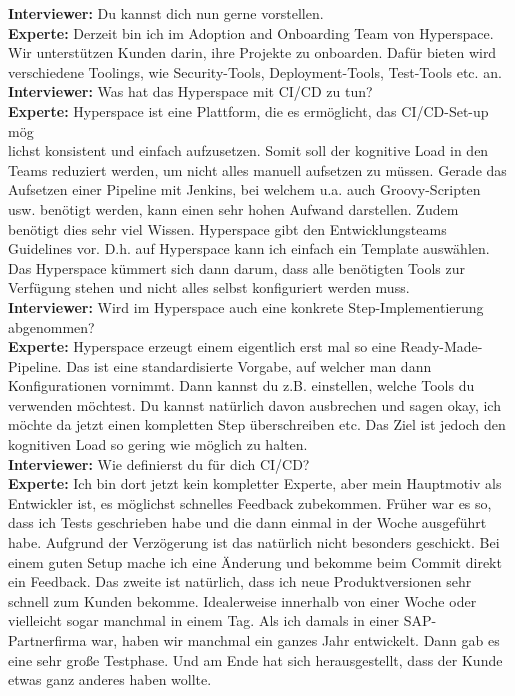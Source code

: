 \begin{linenumbers}
    \textbf{Interviewer:} Du kannst dich nun gerne vorstellen.\\
    \textbf{Experte:} Derzeit bin ich im Adoption and Onboarding Team von Hyperspace. Wir unterstützen Kunden darin, ihre Projekte zu onboarden. Dafür bieten wird verschiedene Toolings, wie Security-Tools, Deployment-Tools, Test-Tools etc. an.\\
    \textbf{Interviewer:} Was hat das Hyperspace mit CI/CD zu tun?\\
    \textbf{Experte:} Hyperspace ist eine Plattform, die es ermöglicht, das CI/CD-Set-up mög\\lichst konsistent und einfach aufzusetzen. Somit soll der kognitive Load in den Teams reduziert werden, um nicht alles manuell aufsetzen zu müssen. Gerade das Aufsetzen einer Pipeline mit Jenkins, bei welchem u.a. auch Groovy-Scripten usw. benötigt werden, kann einen sehr hohen Aufwand darstellen. Zudem benötigt dies sehr viel Wissen. Hyperspace gibt den Entwicklungsteams Guidelines vor. D.h. auf Hyperspace kann ich einfach ein Template auswählen. Das Hyperspace kümmert sich dann darum, dass alle benötigten Tools zur Verfügung stehen und nicht alles selbst konfiguriert werden muss.\\
    \textbf{Interviewer:} Wird im Hyperspace auch eine konkrete Step-Implementierung abgenommen?\\
    \textbf{Experte:}  Hyperspace erzeugt einem eigentlich erst mal so eine Ready-Made-Pipeline. Das ist eine standardisierte Vorgabe, auf welcher man dann Konfigurationen vornimmt. Dann kannst du z.B. einstellen, welche Tools du verwenden möchtest. Du kannst natürlich davon ausbrechen und sagen okay, ich möchte da jetzt einen kompletten Step überschreiben etc. Das Ziel ist jedoch den kognitiven Load so gering wie möglich zu halten.\\
    \textbf{Interviewer:} Wie definierst du für dich CI/CD?\\
    \textbf{Experte:} Ich bin dort jetzt kein kompletter Experte, aber mein Hauptmotiv als Entwickler ist, es möglichst schnelles Feedback zubekommen. Früher war es so, dass ich Tests geschrieben habe und die dann einmal in der Woche ausgeführt habe. Aufgrund der Verzögerung ist das natürlich nicht besonders geschickt. Bei einem guten Setup mache ich eine Änderung und bekomme beim Commit direkt ein Feedback. Das zweite ist natürlich, dass ich neue Produktversionen sehr schnell zum Kunden bekomme. Idealerweise innerhalb von einer Woche oder vielleicht sogar manchmal in einem Tag. Als ich damals in einer SAP-Partnerfirma war, haben wir manchmal ein ganzes Jahr entwickelt. Dann gab es eine sehr große Testphase. Und am Ende hat sich herausgestellt, dass der Kunde etwas ganz anderes haben wollte.\\

\end{linenumbers}
